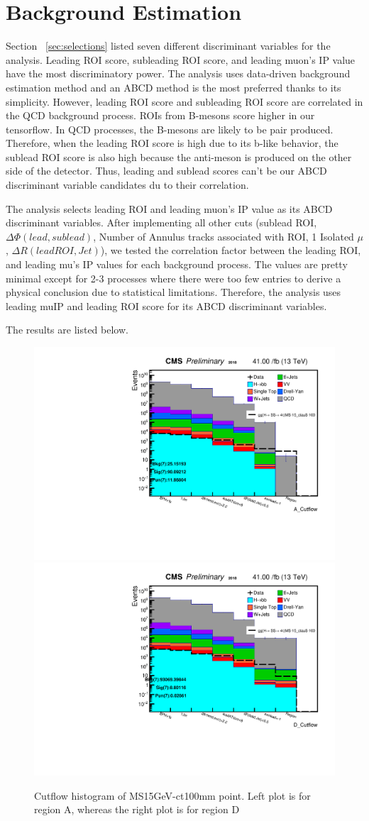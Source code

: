 \clearpage
\chapter{Background Estimation}\label{sec:estimate}

Section ~\ref{sec:selections} listed seven different discriminant variables for the analysis.
Leading ROI score, subleading ROI score, and leading muon's IP value have the most discriminatory power.
The analysis uses data-driven background estimation method and an ABCD method is the most preferred thanks to its simplicity.
However, leading ROI score and subleading ROI score are correlated in the QCD background process.
ROIs from B-mesons score higher in our tensorflow.
In QCD processes, the B-mesons are likely to be pair produced.
Therefore, when the leading ROI score is high due to its b-like behavior, the sublead ROI score is also high because the anti-meson is produced on the other side of the detector.
Thus, leading and sublead scores can't be our ABCD discriminant variable candidates du to their correlation.

The analysis selects leading ROI and leading muon's IP value as its ABCD discriminant variables.
After implementing all other cuts (sublead ROI, $\Delta\Phi(lead,sublead)$, Number of Annulus tracks associated with ROI, 1 Isolated $\mu$, $\Delta R(lead ROI, Jet)$), we tested the correlation factor between the leading ROI, and leading mu's IP values for each background process.
The values are pretty minimal except for 2-3 processes where there were too few entries to derive a physical conclusion due to statistical limitations.
Therefore, the analysis uses leading muIP and leading ROI score for its ABCD discriminant variables.

The results are listed below.  


 \begin{figure}[h!]
   \caption{Cutflow histogram of MS15GeV-ct100mm point. Left plot is for region A, whereas the right plot is for region D}
   \label{fig:ABmethod}
   \centering
   \includegraphics[width=0.47\linewidth]{figs/AnalysisNoteplot_MS-15_ctauS-100_A_Cutflow.pdf}
   \includegraphics[width=0.47\linewidth]{figs/AnalysisNoteplot_MS-15_ctauS-100_D_Cutflow.pdf}
 \end{figure}


